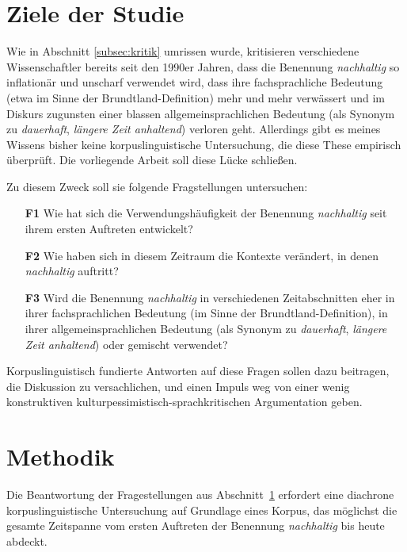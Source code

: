 \documentclass[
    german,
    a4paper,%
    12pt,%
    oneside,%
    toc=bibliography,
    final,
]{scrartcl}
\begin{document}
\section{Ziele der Studie}
\label{sec:ziele}

Wie in Abschnitt \ref{subsec:kritik} umrissen wurde, kritisieren verschiedene Wissenschaftler bereits seit den 1990er Jahren, dass die Benennung \textit{nachhaltig} so inflationär und unscharf verwendet wird, dass ihre fachsprachliche Bedeutung (etwa im Sinne der Brundtland-Definition) mehr und mehr verwässert und im Diskurs zugunsten einer blassen allgemeinsprachlichen Bedeutung (als Synonym zu \textit{dauerhaft}, \textit{längere Zeit anhaltend}) verloren geht. Allerdings gibt es meines Wissens bisher keine korpuslinguistische Untersuchung, die diese These empirisch überprüft. Die vorliegende Arbeit soll diese Lücke schließen.

Zu diesem Zweck soll sie folgende Fragstellungen untersuchen:

\begin{enumerate}[rightmargin=1cm]
\item[\textbf{F1}] Wie hat sich die Verwendungshäufigkeit der Benennung \textit{nachhaltig} seit ihrem ersten Auftreten entwickelt?
\item[\textbf{F2}] Wie haben sich in diesem Zeitraum die Kontexte verändert, in denen \textit{nachhaltig} auftritt?
\item[\textbf{F3}] Wird die Benennung \textit{nachhaltig} in verschiedenen Zeitabschnitten eher in ihrer fachsprachlichen Bedeutung (im Sinne der Brundtland-Definition), in ihrer allgemeinsprachlichen Bedeutung (als Synonym zu \textit{dauerhaft}, \textit{längere Zeit anhaltend}) oder gemischt verwendet?
\end{enumerate}

Korpuslinguistisch fundierte Antworten auf diese Fragen sollen dazu beitragen, die Diskussion zu versachlichen, und einen Impuls weg von einer wenig konstruktiven kulturpessimistisch-sprachkritischen Argumentation geben.

\section{Methodik}
\label{sec:methodik}

Die Beantwortung der Fragestellungen aus Abschnitt~\ref{sec:ziele} erfordert eine diachrone korpuslinguistische Untersuchung auf Grundlage eines Korpus, das möglichst die gesamte Zeitspanne vom ersten Auftreten der Benennung \textit{nachhaltig} bis heute abdeckt.
\end{document}
